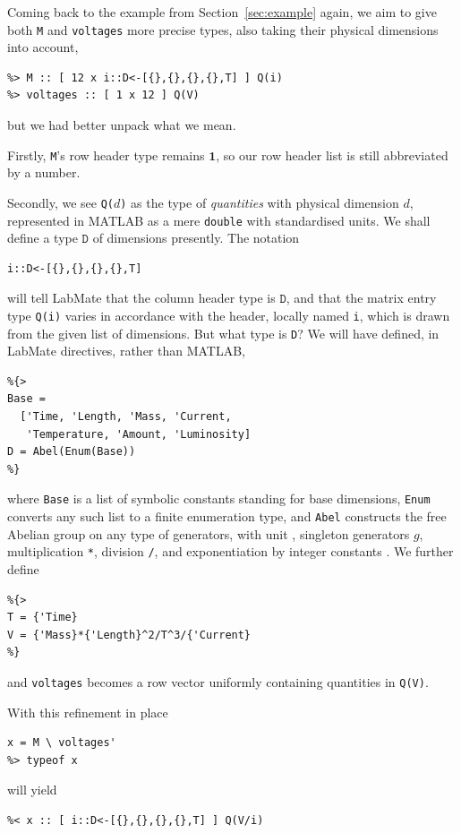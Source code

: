 \documentclass{IMEKO2024}
\newcommand{\lcb}{\texttt{\symbol{123}}}
\newcommand{\rcb}{\texttt{\symbol{125}}}
\newcommand{\crt}{\texttt{\symbol{94}}}
\newcommand{\One}{\mathbf{1}}
\newcommand{\remph}{\emph}
\begin{document}

Coming back to the example from Section~\ref{sec:example} again, we aim to give both \texttt{M} and \texttt{voltages} more precise types, also taking their physical dimensions into account,
\begin{verbatim}
%> M :: [ 12 x i::D<-[{},{},{},{},T] ] Q(i)
%> voltages :: [ 1 x 12 ] Q(V)
\end{verbatim}
  but we had better unpack what we mean.

Firstly, \texttt{M}'s row header type remains $\One$, so our row header list is still abbreviated by a number.

Secondly, we see \texttt{Q(}$d$\texttt{)} as the type of \remph{quantities} with physical dimension $d$, represented in MATLAB as a mere \texttt{double} with standardised units. We shall define a type $\texttt{D}$ of dimensions presently. The notation
\begin{verbatim}
i::D<-[{},{},{},{},T]
\end{verbatim}
will tell LabMate that the column header type is $\texttt{D}$, and that the matrix entry type \texttt{Q(i)} varies in accordance with the header, locally named \texttt{i}, which is drawn from the given list of dimensions.
%
But what type is \texttt{D}? We will have defined, in LabMate directives, rather than MATLAB,
\begin{verbatim}
%{>
Base =
  ['Time, 'Length, 'Mass, 'Current,
   'Temperature, 'Amount, 'Luminosity]
D = Abel(Enum(Base))
%}
\end{verbatim}
where \texttt{Base} is a list of symbolic constants standing for base dimensions, \texttt{Enum} converts any such list to a finite enumeration type, and \texttt{Abel} constructs the free Abelian group on any type of generators, with unit \lcb\rcb, singleton generators \lcb$g$\rcb, multiplication \texttt{*}, division \texttt{/}, and exponentiation by integer constants \crt. We further define
\begin{verbatim}
%{>
T = {'Time}
V = {'Mass}*{'Length}^2/T^3/{'Current}
%}
\end{verbatim}
and \texttt{voltages} becomes a row vector uniformly containing quantities in \texttt{Q(V)}.

With this refinement in place
\begin{verbatim}
x = M \ voltages'
%> typeof x
\end{verbatim}
will yield
\begin{verbatim}
%< x :: [ i::D<-[{},{},{},{},T] ] Q(V/i)
\end{verbatim}
\end{document}
